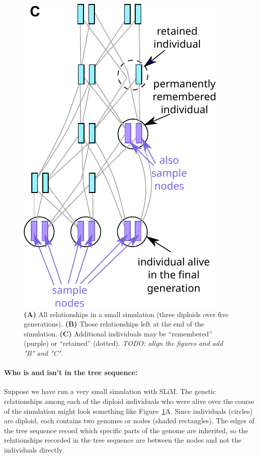 \documentclass[12pt]{article}
\newcommand{\comment}[1]{\textit{\color{green} #1}}
\begin{document}
\begin{figure}
    \includegraphics{figures/pedigree_remember}
\caption{
    \textbf{(A)} All relationships in a small simulation
    (three diploids over five generations).
    \textbf{(B)} Those relationships left at the end of the simulation.
    \textbf{(C)} Additional individuals may be ``remembered'' (purple)
        or ``retained'' (dotted).
    \comment{TODO: align the figures and add "B" and "C".}
}
\label{fig:indivs}
\end{figure}

\paragraph{Who is and isn't in the tree sequence:}
Suppose we have run a very small simulation with SLiM. The genetic relationships among each of the
diploid individuals who were alive over the course of the simulation might
look something like Figure~\ref{fig:indivs}A. Since individuals (circles) are diploid, each contains
two genomes or nodes (shaded rectangles).
The edges of the tree sequence record which specific parts of the genome are inherited,
so the relationships recorded in the tree sequence are between the nodes and not the individuals directly.
\end{document}
